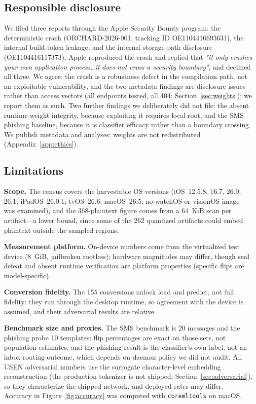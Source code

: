 \documentclass[letterpaper,twocolumn,10pt]{article}
\newcommand{\coremltools}{\texttt{coremltools}\xspace}
\begin{document}
\subsection{Responsible disclosure}
\label{sec:disclosure}

We filed three reports through the Apple Security Bounty program: the
deterministic crash (ORCHARD-2026-001; tracking ID OE1104416693631), the
internal build-token leakage, and the internal storage-path disclosure
(OE1104416117373). Apple reproduced the crash and replied that \emph{"{}it
only crashes your own application process\ldots it does not cross a security
boundary"}, and declined all three. We agree: the crash is a robustness
defect in the compilation path, not an exploitable vulnerability, and the two
metadata findings are disclosure issues rather than access vectors (all
endpoints tested, all 404; Section~\ref{sec:weights}); we report them as such.
Two further findings we deliberately did not file: the absent runtime weight
integrity, because exploiting it requires local root, and the SMS phishing
baseline, because it is classifier efficacy rather than a boundary crossing.
We publish metadata and analyses; weights are not redistributed
(Appendix~\ref{app:ethics}).

\subsection{Limitations}

\textbf{Scope.} The census covers the harvestable OS versions (iOS~12.5.8,
16.7, 26.0, 26.1; iPadOS~26.0.1; tvOS~26.6; macOS~26.5; no watchOS or
visionOS image was examined), and the 368-plaintext figure comes from a
64~KiB scan per artifact---a lower bound, since some of the 262 quantized
artifacts could embed plaintext outside the sampled regions.

\textbf{Measurement platform.} On-device numbers come from the virtualized
test device (8~GiB, jailbroken rootless); hardware magnitudes may differ,
though seal defeat and absent runtime verification are platform properties
(specific flips are model-specific).

\textbf{Conversion fidelity.} The 155 conversions unlock load and predict,
not full fidelity: they run through the desktop runtime, so agreement with
the device is assumed, and their adversarial results are relative.

\textbf{Benchmark size and proxies.} The SMS benchmark is 20 messages and
the phishing probe 10 templates: flip percentages are exact on those sets,
not population estimates, and the phishing result is the classifier's own
label, not an inbox-routing outcome, which depends on daemon policy we did
not audit. All USEN adversarial numbers use the surrogate character-level
embedding reconstruction (the production tokenizer is not shipped;
Section~\ref{sec:adversarial}), so they characterize the shipped network,
and deployed rates may differ.
Accuracy in Figure~\ref{fig:accuracy} was computed with \coremltools{} on
macOS.
\end{document}
